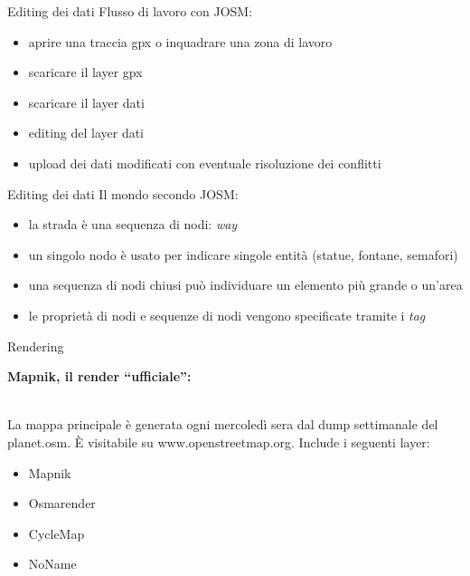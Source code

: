 \documentclass[slidestop,compress,red,notes,xcolor=dvipsnames]{beamer}	%
\begin{document}
        \begin{frame}{Editing dei dati}
            Flusso di lavoro con JOSM:
            \begin{itemize}
                \item aprire una traccia gpx o inquadrare una zona di lavoro
                \item scaricare il layer gpx
                \item scaricare il layer dati
                \item editing del layer dati
                \item upload dei dati modificati con eventuale risoluzione dei conflitti
            \end{itemize}
        \end{frame}

        \begin{frame}{Editing dei dati}
            Il mondo secondo JOSM:
            \begin{itemize}
                \item la strada è una sequenza di nodi: \textit{way}
                \item un singolo nodo è usato per indicare singole entità (statue, fontane, semafori)
                \item una sequenza di nodi chiusi può individuare un elemento più grande o un'area
                \item le proprietà di nodi e sequenze di nodi vengono specificate tramite i \textit{tag}
            \end{itemize}
        \end{frame}

        \begin{frame}{Rendering}
            \begin{large}
                \textbf{Mapnik, il render ``ufficiale'':}
            \end{large}\\
            La mappa principale è generata ogni mercoledì sera dal dump settimanale del planet.osm. È visitabile su www.openstreetmap.org. Include i seguenti layer:
            \begin{itemize}
                \item Mapnik
                \item Osmarender
                \item CycleMap
                \item NoName
            \end{itemize}
        \end{frame}
\end{document}
